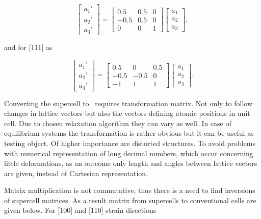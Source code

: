 \begin{equation}
\label{Eq:app_trans_100}
\begin{bmatrix}
a_1' \\ a_2' \\ a_3'
\end{bmatrix}=
\begin{bmatrix}
0.5 & 0.5 & 0 \\
-0.5 & 0.5 & 0 \\
0 & 0 & 1
\end{bmatrix}
\begin{bmatrix}
a_1 \\ a_2 \\ a_3
\end{bmatrix},
\end{equation}

and for [111] as

\begin{equation}
\label{Eq:app_trans_111}
\begin{bmatrix}
a_1' \\ a_2' \\ a_3'
\end{bmatrix}=
\begin{bmatrix}
0.5 & 0 & 0.5 \\
-0.5 & -0.5 & 0 \\
-1 & 1 & 1
\end{bmatrix}
\begin{bmatrix}
a_1 \\ a_2 \\ a_3
\end{bmatrix}.
\end{equation}

Converting the supercell to \prim\ requires transformation matrix.
Not only to follow changes in lattice vectors but also the vectors defining atomic positions in unit cell.
Due to chosen relaxation algorithm they can vary as well.
In case of equilibrium systems the transformation is rather obvious but it can be useful as testing object.
Of higher importance are distorted structures.
To avoid problems with numerical representation of long decimal numbers, which occur concerning little deformations, as an outcome only length and angles between lattice vectors are given, instead of Cartesian representation.

Matrix multiplication is not commutative, thus there is a need to find inversions of supercell matrices.
As a result matrix from supercells to conventional cells are given below.
For [100] and [110] strain directions

